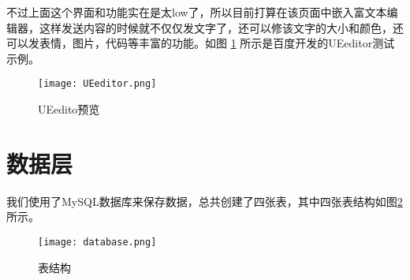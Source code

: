 \documentclass[]{article}
\begin{document}
不过上面这个界面和功能实在是太low了，所以目前打算在该页面中嵌入富文本编辑器，这样发送内容的时候就不仅仅发文字了，还可以修该文字的大小和颜色，还可以发表情，图片，代码等丰富的功能。如图 \ref{fig:graph5} 所示是百度开发的UEeditor测试示例。

\begin{figure}[h]
	\centering
	\texttt{[image: UEeditor.png]}
	\caption{UEedito预览}
	\label{fig:graph5}
\end{figure}


\section{数据层}
我们使用了MySQL数据库来保存数据，总共创建了四张表，其中四张表结构如图\ref{fig:graph6}所示。

\begin{figure}[h]
	\centering
	\texttt{[image: database.png]}
	\caption{表结构}
	\label{fig:graph6}
\end{figure}
\end{document}
